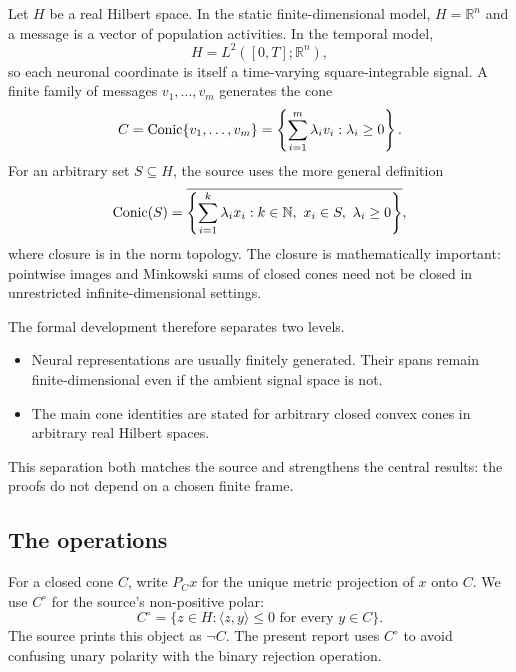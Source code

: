 \documentclass[11pt,a4paper]{article}
\begin{document}
Let \(H\) be a real Hilbert space. In the static finite-dimensional model,
\(H=\mathbb{R}^n\) and a message is a vector of population activities. In the
temporal model,
\[
  H=L^2([0,T];\mathbb{R}^n),
\]
so each neuronal coordinate is itself a time-varying square-integrable
signal. A finite family of messages \(v_1,\ldots,v_m\) generates the cone
\[
  C=\operatorname{Conic}\{v_1,\ldots,v_m\}
   =\left\{\sum_{i=1}^{m}\lambda_i v_i:\lambda_i\geq 0\right\}.
\]
For an arbitrary set \(S\subseteq H\), the source uses the more general
definition
\[
  \operatorname{Conic}(S)=
  \overline{\left\{\sum_{i=1}^{k}\lambda_i x_i:
  k\in\mathbb{N},\ x_i\in S,\ \lambda_i\geq0\right\}},
\]
where closure is in the norm topology. The closure is mathematically
important: pointwise images and Minkowski sums of closed cones need not be
closed in unrestricted infinite-dimensional settings.

The formal development therefore separates two levels.

\begin{itemize}
  \item Neural representations are usually finitely generated. Their spans
    remain finite-dimensional even if the ambient signal space is not.
  \item The main cone identities are stated for arbitrary closed convex cones
    in arbitrary real Hilbert spaces.
\end{itemize}

This separation both matches the source and strengthens the central results:
the proofs do not depend on a chosen finite frame.

\subsection{The operations}

For a closed cone \(C\), write \(P_Cx\) for the unique metric projection of
\(x\) onto \(C\). We use \(C^\circ\) for the source's non-positive polar:
\[
  C^\circ=\{z\in H:\langle z,y\rangle\leq 0
  \text{ for every }y\in C\}.
\]
The source prints this object as \(\neg C\). The present report uses
\(C^\circ\) to avoid confusing unary polarity with the binary rejection
operation.
\end{document}
